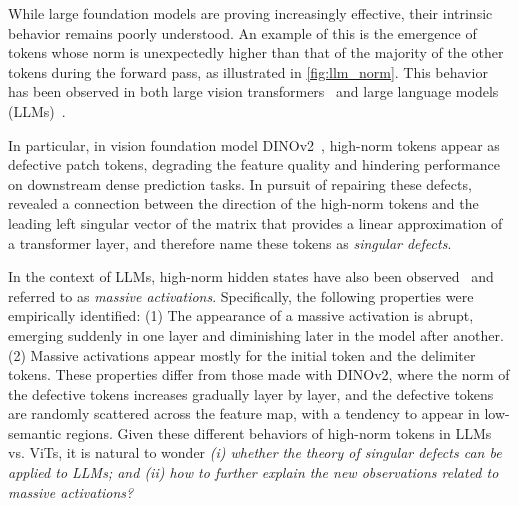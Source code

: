 While large foundation models are proving increasingly effective, their intrinsic behavior remains poorly understood. An example of this is the emergence of tokens whose norm is unexpectedly higher than that of the majority of the other tokens during the forward pass, as illustrated in \cref{fig:llm_norm}. This behavior has been observed in both large vision transformers~\cite{darcetvision,wang2024sinder} and large language models (LLMs)~\cite{sun2024massive}.


In particular, in vision foundation model DINOv2~\cite{oquab2024dinov2,darcetvision}, high-norm tokens appear as defective patch tokens, degrading the feature quality and hindering performance on downstream dense prediction tasks.
In pursuit of repairing these defects, \citet{wang2024sinder} revealed a connection between the direction of the high-norm tokens and the leading left singular vector of the matrix that provides a linear approximation of a transformer layer, and therefore name these tokens as \emph{singular defects}.

In the context of LLMs, high-norm hidden states have also been observed~\cite{sun2024massive} and referred to as \emph{massive activations}. Specifically, the following properties were empirically identified:
(1) The appearance of a massive activation is abrupt, emerging suddenly in one layer and diminishing later in the model after another.
(2) Massive activations appear mostly for the initial token and the delimiter tokens.
These properties differ from those made with DINOv2, where the norm of the defective tokens increases gradually layer by layer, and the defective tokens are randomly scattered across the feature map, with a tendency to appear in low-semantic regions.
Given these different behaviors of high-norm tokens in LLMs vs. ViTs, it is natural to wonder \emph{(i) whether the theory of singular defects can be applied to LLMs; and (ii) how to further explain the new observations related to massive activations?}

